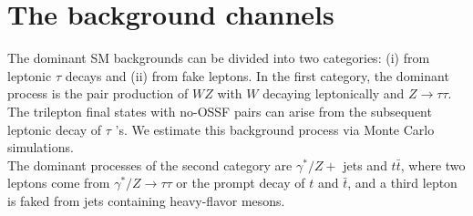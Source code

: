 \section{The background channels}
The dominant SM backgrounds can be divided into two categories: (i) from leptonic $\tau$ decays and (ii) from fake leptons. In the first category, the dominant process is the pair production of $W Z$ with $W$ decaying leptonically and $Z \rightarrow \tau \tau$. The trilepton final states with no-OSSF pairs can arise from the subsequent leptonic decay of $\tau$ 's. We estimate this background process via Monte Carlo simulations.
\\
The dominant processes of the second category are $\gamma^{*} / Z+$ jets and $t \bar{t}$, where two leptons come from $\gamma^{*} / Z \rightarrow \tau \tau$ or the prompt decay of $t$ and $\bar{t}$, and a third lepton is faked from jets containing heavy-flavor mesons.
